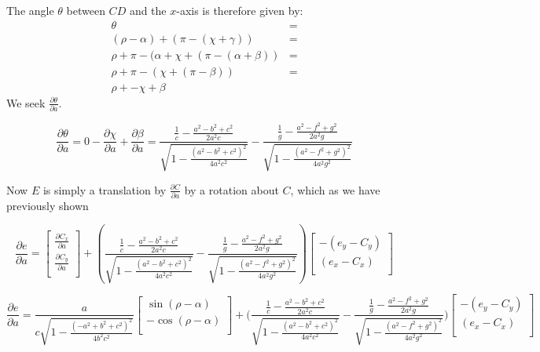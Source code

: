 \documentclass[11pt]{article}
\begin{document}
The angle $\theta$ between $CD$ and the $x$-axis is therefore given by:
\begin{align*}
  \theta &= \\
  (\rho - \alpha) + (\pi - (\chi + \gamma)) &= \\
\rho + \pi - (\alpha + \chi + (\pi - (\alpha + \beta)) &= \\
\rho + \pi - (\chi + (\pi  -\beta))  &= \\
\rho + -\chi + \beta
\end{align*}
We seek $\frac{\partial \theta}{\partial a}$.

\[
\frac{\partial \theta}{\partial a} = 0 - \frac{\partial \chi}{\partial a} +
\frac{\partial \beta}{\partial a} =
\frac{\frac{1}{c} - \frac{a^2 - b^2 + c^2}{2 a^2 c}}
{\sqrt{1 - \frac{(a^2 - b^2 + c^2)^2}{4 a^2 c^2}}}
-\frac{\frac{1}{g} - \frac{a^2 - f^2 + g^2}{2 a^2 g}}
{\sqrt{1 - \frac{(a^2 - f^2 + g^2)^2}{4 a^2 g^2}}}
\]

Now $E$ is simply a translation by $\frac{\partial C}{\partial a}$ by a rotation
about $C$, which as we have previously shown

\[
\frac{\partial e}{\partial  a} = 
\begin{bmatrix}
  \frac{\partial C_x}{\partial a}  \\
  \frac{\partial C_y}{\partial a} \\
  \end{bmatrix}
 +
(\frac{\frac{1}{c} - \frac{a^2 - b^2 + c^2}{2 a^2 c}}
{\sqrt{1 - \frac{(a^2 - b^2 + c^2)^2}{4 a^2 c^2}}}
-\frac{\frac{1}{g} - \frac{a^2 - f^2 + g^2}{2 a^2 g}}
{\sqrt{1 - \frac{(a^2 - f^2 + g^2)^2}{4 a^2 g^2}}})
\begin{bmatrix}
           -(e_y -C_y)  \\
           (e_x - C_x )  \\
         \end{bmatrix}
\]

\[
\frac{\partial e}{\partial  a} =
\frac{a}{c \sqrt{1 - \frac{(-a^2 + b^2 + c^2)^2}{4 b^2 c^2}}}
\begin{bmatrix}
 \sin{(\rho - \alpha)}  \\
- \cos{(\rho - \alpha)}  \\
\end{bmatrix}
 +
\Bigg(\frac{\frac{1}{c} - \frac{a^2 - b^2 + c^2}{2 a^2 c}}
{\sqrt{1 - \frac{(a^2 - b^2 + c^2)^2}{4 a^2 c^2}}}
-\frac{\frac{1}{g} - \frac{a^2 - f^2 + g^2}{2 a^2 g}}
{\sqrt{1 - \frac{(a^2 - f^2 + g^2)^2}{4 a^2 g^2}}}
\Bigg)
\begin{bmatrix}
           -(e_y -C_y)  \\
           (e_x - C_x )  \\
         \end{bmatrix}
\]
\end{document}
